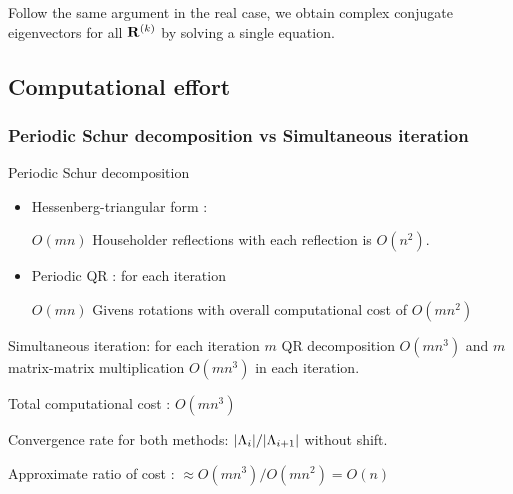 \documentclass[mathserif, handout]{beamer}
\begin{document}
\begin{frame}[allowframebreaks]
\begin{itemize}
       Follow the same argument in the real case, we obtain complex conjugate
       eigenvectors for all $\mathbf{R}^{(k)}$ by solving a single equation.

  \end{itemize}
  
\end{frame}

\subsection{Computational effort}

\begin{frame}
  \frametitle{Periodic Schur decomposition vs Simultaneous iteration}
  \begin{block}{Periodic Schur decomposition}
    
    \begin{itemize}
    \item {\color{cyan} Hessenberg-triangular form} :
      
      $O(mn)$ Householder reflections 
      with each reflection is $O(n^{2})$.
    \item {\color{cyan} Periodic QR} : for each iteration 
      
      $O(mn)$
      Givens rotations with overall computational cost of $O(mn^{2})$
    \end{itemize}
  \end{block}
  
  \pause 
  
  \begin{block}{  Simultaneous iteration: for each iteration}
    $m$ {\color{cyan} QR decomposition} 
    $O(mn^{3})$ and $m$ {\color{cyan} matrix-matrix multiplication}
    $O(mn^{3})$ in each iteration. 

    Total computational cost : $O(mn^{3})$
  \end{block}

  \pause 

  Convergence  rate for both methods: 
  $|\Lambda_{i}|/|\Lambda_{i+1}|$  without shift.

  Approximate ratio of cost : $\approx O(mn^3)/O(mn^2) = O(n)$
  
\end{frame}
\end{document}
